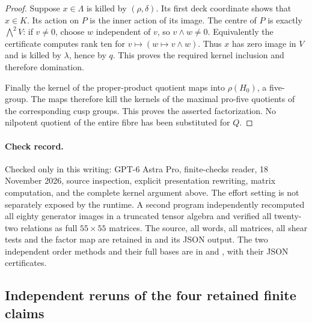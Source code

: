 \begin{proof}
Suppose $x\in\Lambda$ is killed by $(\rho,\delta)$. Its first
deck coordinate shows that $x\in K$. Its action on $P$ is the
inner action of its image. The centre of $P$ is exactly
$\bigwedge^2V$: if $v\ne0$, choose $w$ independent of $v$, so
$v\wedge w\ne0$. Equivalently the certificate computes rank ten
for $v\mapsto(w\mapsto v\wedge w)$. Thus $x$ has zero image in
$V$ and is killed by $\lambda$, hence by $q$. This proves the
required kernel inclusion and therefore domination.

Finally the kernel of the proper-product quotient maps into
$\rho(H_0)$, a five-group. The maps therefore kill the kernels of
the maximal pro-five quotients of the corresponding cusp groups.
This proves the asserted factorization. No nilpotent quotient of
the entire fibre has been substituted for $Q$.
\end{proof}

\paragraph{Check record.}
Checked only in this writing: GPT-6 Astra Pro, finite-checks reader,
18 November 2026, source inspection, explicit presentation rewriting,
matrix computation, and the complete kernel argument above.
The effort setting is not separately exposed by the runtime.
A second program independently recomputed all eighty generator images
in a truncated tensor algebra and verified all twenty-two relations
as full $55\times55$ matrices. The source, all words, all matrices,
all shear tests and the factor map
are retained in  and its JSON output.
The two independent order methods and their full bases are in
 and ,
with their JSON certificates.

\subsection{Independent reruns of the four retained finite claims}

